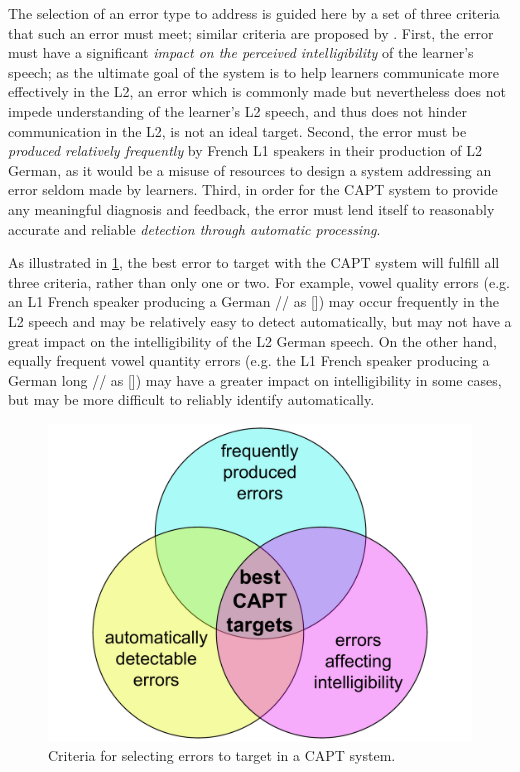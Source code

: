 	The selection of an error type to address is guided here by
a set of three criteria that such an error must meet; similar criteria are proposed by \textcite{Neri2002,Cucchiarini2009}.
%
First, 
the error must have a significant \textit{impact on the perceived intelligibility} of the learner's speech; 
as the ultimate goal of the system is to help learners communicate more effectively in the L2,
 an error which is commonly made but nevertheless does not impede understanding of the learner's L2 speech, and thus does not hinder communication in the L2, is not an ideal target. 
%
Second,
the error must be \textit{produced relatively frequently} by French L1 speakers in their production of L2 German, as it would be a misuse of resources to design a system addressing an error seldom made by learners. %
%
Third,
in order for the CAPT system to provide any meaningful diagnosis and feedback, the error must lend itself to reasonably accurate and reliable  \textit{detection through automatic processing}. 



As illustrated in \cref{fig:errors}, the best error to target with the CAPT system will fulfill all three criteria, rather than only one or two. 
	 For example, vowel quality errors (e.g. an L1 French speaker producing a German // as [\textipa{\oe}]) may occur frequently in the L2 speech and may be relatively easy to detect automatically, but may not have a great impact on the intelligibility of the L2 German speech. On the other hand, equally frequent vowel quantity errors (e.g. the L1 French speaker producing a German long // as []) may have a greater impact on intelligibility in some cases, but may be more difficult to reliably identify automatically.

		\begin{figure}[htb]
			\centering
			\includegraphics[width=.7\textwidth]{img/error-venn}
			\caption{Criteria for selecting errors to target in a CAPT system.}
			\label{fig:errors}
		\end{figure}

